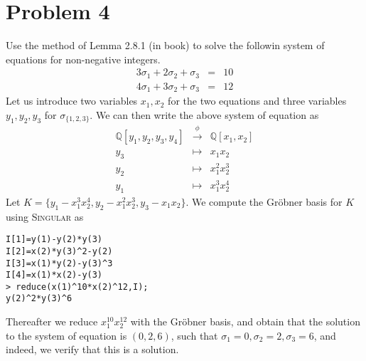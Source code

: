 \documentclass{article}[12pt]
\def\QQ{\mathbb Q}
\begin{document}
\section*{Problem 4}
Use the method of Lemma 2.8.1 (in book) to solve the followin system of
equations for non-negative integers.
\begin{eqnarray}
3\sigma_1 + 2\sigma_2 + \sigma_3 & = & 10 \\ \nonumber
4\sigma_1 + 3\sigma_2 + \sigma_3 & = & 12
\end{eqnarray}
Let us introduce two variables $x_1,x_2$ for the two equations and
three variables $y_1,y_2,y_3$ for $\sigma_{\{1,2,3\}}$.
We can then write the above system of equation as
\begin{eqnarray}
\QQ[y_1,y_2,y_3,y_4] & \xrightarrow{\phi} & \QQ[x_1,x_2]  \nonumber \\
y_3 & \mapsto & x_1x_2 \nonumber \\
y_2 & \mapsto & x_1^2x_2^3 \nonumber \\
y_1 & \mapsto & x_1^3x_2^4 \nonumber
\end{eqnarray}
Let $K=\{y_1-x_1^3x_2^4,y_2-x_1^2x_2^3,y_3-x_1x_2\}$.
We compute the Gr\"obner basis for $K$ using \textsc{Singular} as
\begin{verbatim}
I[1]=y(1)-y(2)*y(3)
I[2]=x(2)*y(3)^2-y(2)
I[3]=x(1)*y(2)-y(3)^3
I[4]=x(1)*x(2)-y(3)
> reduce(x(1)^10*x(2)^12,I);
y(2)^2*y(3)^6
\end{verbatim}
Thereafter we reduce $x_1^{10}x_2^{12}$ with the Gr\"obner basis, and
obtain that the solution to the system of equation is $(0,2,6)$, such
that $\sigma_1=0,\sigma_2=2,\sigma_3=6$, and indeed, we verify that this
is a solution.
\end{document}
